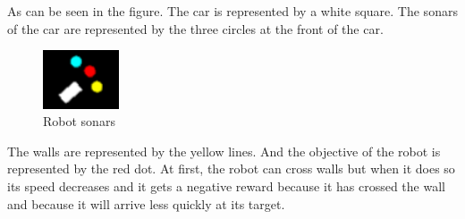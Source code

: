     As can be seen in the figure. The car is represented by a white square. The sonars of the car are represented by the three circles at the front of the car.
    
    \begin{figure}[H]
        \centering
        \includegraphics[width=0.2\textwidth]{imgs/robot.png}
        \caption{\label{fig:simulation} Robot sonars}
    \end{figure}
    

    The walls are represented by the yellow lines. And the objective of the robot is represented by the red dot. 
    At first, the robot can cross walls but when it does so its speed decreases and it gets a negative reward because it has crossed the wall and because it will arrive less quickly at its target.
